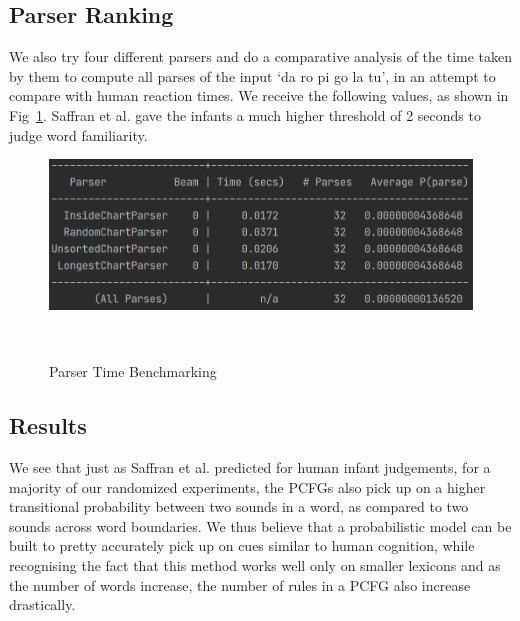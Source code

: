 \documentclass{article}
\begin{document}
\subsection{Parser Ranking}
We also try four different parsers and do a comparative analysis of the time taken by them to compute all parses of the input `da ro pi go la tu', in an attempt to compare with human reaction times. We receive the following values, as shown in Fig~\ref{fig:figure3}. Saffran et al. gave the infants a much higher threshold of 2 seconds to judge word familiarity.



\begin{figure}[h!]
  \centering
  \includegraphics[width=\columnwidth]{figures/parser_times.png}
  \caption{Parser Time Benchmarking}~\label{fig:figure3}
\end{figure}

\vspace{-3mm}
\subsection{Results}
We see that just as Saffran et al. predicted for human infant judgements, for a majority of our randomized experiments, the PCFGs also pick up on a higher transitional probability between two sounds in a word, as compared to two sounds across word boundaries. We thus believe that a probabilistic model can be built to pretty accurately pick up on cues similar to human cognition, while recognising the fact that this method works well only on smaller lexicons and as the number of words increase, the number of rules in a PCFG also increase drastically.
\end{document}
